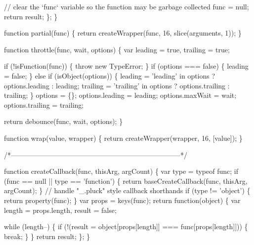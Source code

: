 \begin{DoxyCodeInclude}
{{      \textcolor{comment}{// clear the `func` variable so the function may be garbage collected}
      func = null;
      \textcolor{keywordflow}{return} result;
    \};
  \}

  \textcolor{keyword}{function} partial(func) \{
    \textcolor{keywordflow}{return} createWrapper(func, 16, slice(arguments, 1));
  \}

  \textcolor{keyword}{function} throttle(func, wait, options) \{
    var leading = \textcolor{keyword}{true},
        trailing = \textcolor{keyword}{true};

    \textcolor{keywordflow}{if} (!isFunction(func)) \{
      \textcolor{keywordflow}{throw} \textcolor{keyword}{new} TypeError;
    \}
    \textcolor{keywordflow}{if} (options === \textcolor{keyword}{false}) \{
      leading = \textcolor{keyword}{false};
    \} \textcolor{keywordflow}{else} \textcolor{keywordflow}{if} (isObject(options)) \{
      leading = \textcolor{stringliteral}{'leading'} in options ? options.leading : leading;
      trailing = \textcolor{stringliteral}{'trailing'} in options ? options.trailing : trailing;
    \}
    options = \{\};
    options.leading = leading;
    options.maxWait = wait;
    options.trailing = trailing;

    \textcolor{keywordflow}{return} debounce(func, wait, options);
  \}

  \textcolor{keyword}{function} wrap(value, wrapper) \{
    \textcolor{keywordflow}{return} createWrapper(wrapper, 16, [value]);
  \}

  \textcolor{comment}{/*--------------------------------------------------------------------------*/}

  \textcolor{keyword}{function} createCallback(func, thisArg, argCount) \{
    var type = typeof func;
    \textcolor{keywordflow}{if} (func == null || type == \textcolor{stringliteral}{'function'}) \{
      \textcolor{keywordflow}{return} baseCreateCallback(func, thisArg, argCount);
    \}
    \textcolor{comment}{// handle "\_.pluck" style callback shorthands}
    \textcolor{keywordflow}{if} (type != \textcolor{stringliteral}{'object'}) \{
      \textcolor{keywordflow}{return} property(func);
    \}
    var props = keys(func);
    \textcolor{keywordflow}{return} \textcolor{keyword}{function}(object) \{
      var length = props.length,
          result = \textcolor{keyword}{false};

      \textcolor{keywordflow}{while} (length--) \{
        \textcolor{keywordflow}{if} (!(result = \textcolor{keywordtype}{object}[props[length]] === func[props[length]])) \{
          \textcolor{keywordflow}{break};
        \}
      \}
      \textcolor{keywordflow}{return} result;
    \};
  \}

}}
\end{DoxyCodeInclude}
